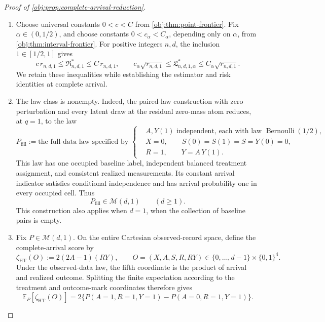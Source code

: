 \documentclass[11pt]{article}
\begin{document}
\begin{proof}[Proof of \cref{obj:prop:complete-arrival-reduction}]
\begin{enumerate}
\item Choose universal constants \(0<c<C\) from \cref{obj:thm:point-frontier}. Fix \(\alpha\in(0,1/2)\), and choose constants \(0<c_\alpha<C_\alpha\), depending only on \(\alpha\), from \cref{obj:thm:interval-frontier}. For positive integers \(n,d\), the inclusion \(1\in[1/2,1]\) gives
\[
c\,r_{n,d,1}
\le \mathfrak R^*_{n,d,1}
\le C\,r_{n,d,1},
\qquad
c_\alpha\sqrt{r_{n,d,1}}
\le \mathfrak L^*_{n,d,1,\alpha}
\le C_\alpha\sqrt{r_{n,d,1}}.
\]
We retain these inequalities while establishing the estimator and risk identities at complete arrival.

\item The law class is nonempty. Indeed, the paired-law construction with zero perturbation and every latent draw at the residual zero-mass atom reduces, at \(q=1\), to the law
\[
P_{\mathrm{fill}}
:=
\text{the full-data law specified by }
\left\{
\begin{aligned}
&A,Y(1)\text{ independent, each with law }\operatorname{Bernoulli}(1/2),\\
&X=0,\qquad S(0)=S(1)=S=Y(0)=0,\\
&R=1,\qquad Y=A\,Y(1).
\end{aligned}
\right.
\]
This law has one occupied baseline label, independent balanced treatment assignment, and consistent realized measurements. Its constant arrival indicator satisfies conditional independence and has arrival probability one in every occupied cell. Thus
\[
P_{\mathrm{fill}}\in\mathcal M(d,1)
\qquad(d\ge1).
\]
This construction also applies when \(d=1\), when the collection of baseline pairs is empty.

\item Fix \(P\in\mathcal M(d,1)\). On the entire Cartesian observed-record space, define the complete-arrival score by
\[
\zeta_{\mathrm{HT}}(O)
:=2(2A-1)(RY),
\qquad
O=(X,A,S,R,RY)\in\{0,\ldots,d-1\}\times\{0,1\}^{4}.
\]
Under the observed-data law, the fifth coordinate is the product of arrival and realized outcome. Splitting the finite expectation according to the treatment and outcome-mark coordinates therefore gives
\[
\mathbb E_P[\zeta_{\mathrm{HT}}(O)]
=
2\bigl\{
P(A=1,R=1,Y=1)-P(A=0,R=1,Y=1)
\bigr\}.
\]


\end{enumerate}
\end{proof}
\end{document}
